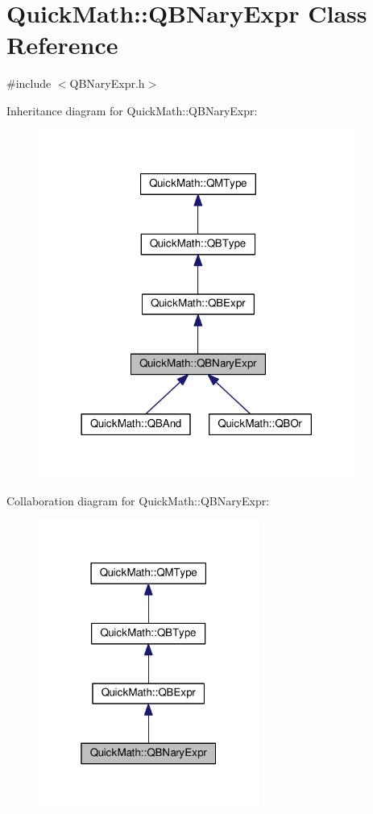 \hypertarget{classQuickMath_1_1QBNaryExpr}{}\section{Quick\+Math\+:\+:Q\+B\+Nary\+Expr Class Reference}
\label{classQuickMath_1_1QBNaryExpr}


{\ttfamily \#include $<$Q\+B\+Nary\+Expr.\+h$>$}



Inheritance diagram for Quick\+Math\+:\+:Q\+B\+Nary\+Expr\+:
\nopagebreak
\begin{figure}[H]
\begin{center}
\leavevmode
\includegraphics[width=294pt]{classQuickMath_1_1QBNaryExpr__inherit__graph}
\end{center}
\end{figure}


Collaboration diagram for Quick\+Math\+:\+:Q\+B\+Nary\+Expr\+:
\nopagebreak
\begin{figure}[H]
\begin{center}
\leavevmode
\includegraphics[width=205pt]{classQuickMath_1_1QBNaryExpr__coll__graph}
\end{center}
\end{figure}

